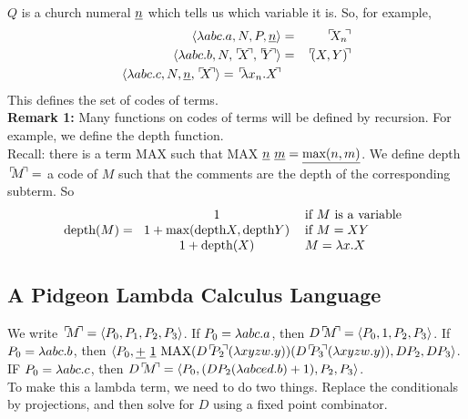 $Q$ is a church numeral $\uline{n}$ which tells us which variable it is. So, for example,
\begin{eqnarray*}
  \langle \l abc.a,N,P,\uline{n} \rangle &=& \godnum{X_n}\\
  \langle \l abc.b,N,\godnum{X},\godnum{Y} \rangle &=& \godnum{(X,Y)}\\
  \langle \l abc.c,N,\uline{n},\godnum{X} \rangle = \godnum{\l x_n.X}\\
\end{eqnarray*}
This defines the set of codes of terms.\\

\textbf{Remark 1:} Many functions on codes of terms will be defined by recursion. For example, we define the depth function.\\

Recall: there is a term MAX such that MAX$\ \uline{n}\ \uline{m} = \uline{\hbox{max}(n,m)}$. We define depth$\godnum{M} =$ a code of $M$ such that the comments are the depth of the corresponding subterm. So
\begin{equation*}
  \hbox{depth}(M) = \begin{tabular}{c l}
    $1$ & if $M$ is a variable\\
    $1 + \hbox{max}(\hbox{depth} X, \hbox{depth} Y)$ & if $M = XY$\\
    $1 + \hbox{depth}(X)$ & $M = \l x.X$
  \end{tabular}
\end{equation*}

\subsection{A Pidgeon Lambda Calculus Language}
We write $\godnum{M} = \langle P_0, P_1, P_2, P_3 \rangle$. If $P_0 = \lambda abc.a$, then $D\godnum{M} = \langle P_0, 1, P_2, P_3 \rangle$. If $P_0 = \lambda abc.b$, then $\langle P_0, \uline{+}\ \uline{1}\ \hbox{MAX} (D\godnum{P_2}(\l xyzw.y)) (D\godnum{P_3}(\l xyzw.y)), DP_2, DP_3 \rangle$. IF $P_0 = \lambda abc.c$, then $D\godnum{M} = \langle P_0, (DP_2(\l abced.b) + 1), P_2,P_3 \rangle$.\\

To make this a lambda term, we need to do two things. Replace the conditionals by projections, and then solve for $D$ using a fixed point combinator.